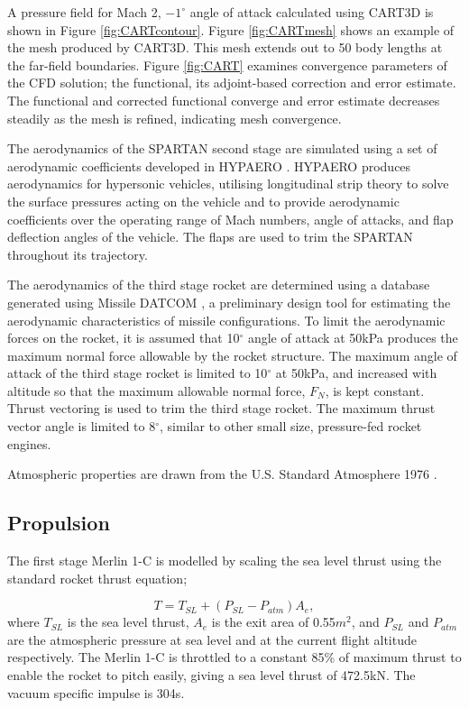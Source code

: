 \documentclass[journal]{new-aiaa}
\begin{document}
A pressure field for Mach 2, $-1^\circ$ angle of attack calculated using CART3D is shown in Figure \ref{fig:CARTcontour}. Figure \ref{fig:CARTmesh} shows an example of the mesh produced by CART3D. This mesh extends out to 50 body lengths at the far-field boundaries. Figure \ref{fig:CART} examines convergence parameters of the CFD solution; the functional, its adjoint-based correction and error estimate. The functional and corrected functional converge and error estimate decreases steadily as the mesh is refined, indicating mesh convergence.

The aerodynamics of the SPARTAN second stage are simulated using a set of aerodynamic coefficients developed in HYPAERO \cite{Jazra2009,Preller2017}. HYPAERO produces aerodynamics for hypersonic vehicles, utilising longitudinal strip theory to solve the surface pressures acting on the vehicle and to provide aerodynamic coefficients over the operating range of Mach numbers, angle of attacks, and flap deflection angles of the vehicle. The flaps are used to trim the SPARTAN throughout its trajectory. 

The aerodynamics of the third stage rocket are determined using a database generated using Missile DATCOM \cite{Blake1998}, a preliminary design tool for estimating the aerodynamic characteristics of missile configurations. 
To limit the aerodynamic forces on the rocket, it is assumed that 10$^\circ$ angle of attack at 50kPa produces the maximum normal force allowable by the rocket structure. The maximum angle of attack of the third stage rocket is limited to 10$^\circ$ at 50kPa, and increased with altitude so that the maximum allowable normal force, $F_N$, is kept constant. Thrust vectoring is used to trim the third stage rocket. The maximum thrust vector angle is limited to 8$^\circ$, similar to other small size, pressure-fed rocket engines\cite{Zandbergen}. 

Atmospheric properties are drawn from the U.S. Standard Atmosphere 1976 \cite{Administration1976}.  
\subsection{Propulsion}
The first stage Merlin 1-C is modelled by scaling the sea level thrust using the standard rocket thrust equation;

\begin{equation}
T = T_{SL} + (P_{SL}-P_{atm}) A_e,
\end{equation}
where $T_{SL}$ is the sea level thrust, $A_e$ is the exit area of 0.55$m^2$, and $P_{SL}$ and $P_{atm}$ are the atmospheric pressure at sea level and at the current flight altitude respectively. The Merlin 1-C is throttled to a constant 85\% of maximum thrust to enable the rocket to pitch easily, giving a sea level thrust of 472.5kN\cite{Vehicle2008}. The vacuum specific impulse is 304s\cite{Vehicle2008}.
\end{document}
